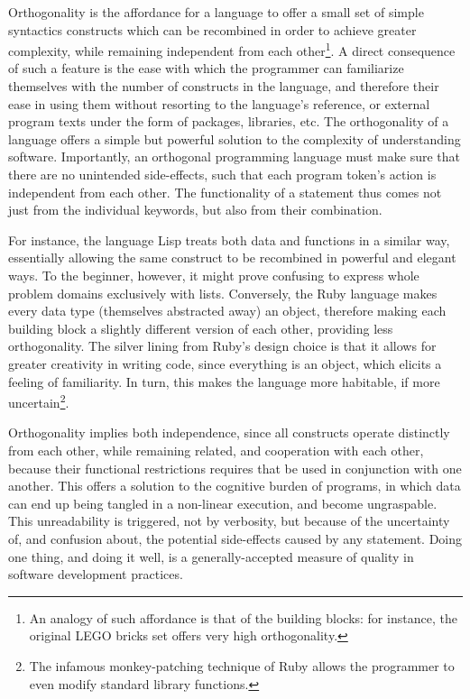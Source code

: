 Orthogonality is the affordance for a language to offer a small set of simple syntactics constructs which can be recombined in order to achieve greater complexity, while remaining independent from each other\footnote{An analogy of such affordance is that of the building blocks: for instance, the original LEGO bricks set offers very high orthogonality.}. A direct consequence of such a feature is the ease with which the programmer can familiarize themselves with the number of constructs in the language, and therefore their ease in using them without resorting to the language's reference, or external program texts under the form of packages, libraries, etc. The orthogonality of a language offers a simple but powerful solution to the complexity of understanding software. Importantly, an orthogonal programming language must make sure that there are no unintended side-effects, such that each program token's action is independent from each other. The functionality of a statement thus comes not just from the individual keywords, but also from their combination.

For instance, the language Lisp treats both data and functions in a similar way, essentially allowing the same construct to be recombined in powerful and elegant ways. To the beginner, however, it might prove confusing to express whole problem domains exclusively with lists. Conversely, the Ruby language makes every data type (themselves abstracted away) an object, therefore making each building block a slightly different version of each other, providing less orthogonality. The silver lining from Ruby's design choice is that it allows for greater creativity in writing code, since everything is an object, which elicits a feeling of familiarity. In turn, this makes the language more habitable, if more uncertain\footnote{The infamous monkey-patching technique of Ruby allows the programmer to even modify standard library functions.}.

Orthogonality implies both independence, since all constructs operate distinctly from each other, while remaining related, and cooperation with each other, because their functional restrictions requires that be used in conjunction with one another. This offers a solution to the cognitive burden of programs, in which data can end up being tangled in a non-linear execution, and become ungraspable. This unreadability is triggered, not by verbosity, but because of the uncertainty of, and confusion about, the potential side-effects caused by any statement. Doing one thing, and doing it well, is a generally-accepted measure of quality in software development practices.

